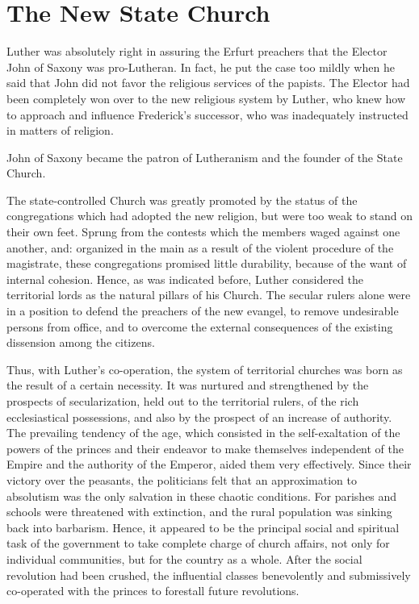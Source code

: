 \section{The New State Church}

Luther was absolutely right in assuring the Erfurt preachers that
the Elector John of Saxony was pro-Lutheran. In fact, he put the
case too mildly when he said that John did not favor the religious
services of the papists. The Elector had been completely won over
to the new religious system by Luther, who knew how to approach
and influence Frederick’s successor, who was inadequately instructed
in matters of religion.

John of Saxony became the patron of Lutheranism and the founder
of the State Church.

The state-controlled Church was greatly promoted by the status
of the congregations which had adopted the new religion, but were
too weak to stand on their own feet. Sprung from the contests
which the members waged against one another, and: organized in
the main as a result of the violent procedure of the magistrate, these
congregations promised little durability, because of the want of internal
cohesion. Hence, as was indicated before, Luther considered
the territorial lords as the natural pillars of his Church. The secular
rulers alone were in a position to defend the preachers of the new
evangel, to remove undesirable persons from office, and to overcome
the external consequences of the existing dissension among the
citizens.

Thus, with Luther’s co-operation, the system of territorial churches
was born as the result of a certain necessity. It was nurtured and
strengthened by the prospects of secularization, held out to the territorial
rulers, of the rich ecclesiastical possessions, and also by the
prospect of an increase of authority. The prevailing tendency of
the age, which consisted in the self-exaltation of the powers of
the princes and their endeavor to make themselves independent of
the Empire and the authority of the Emperor, aided them very
effectively. Since their victory over the peasants, the politicians felt
that an approximation to absolutism was the only salvation in
these chaotic conditions. For parishes and schools were threatened
with extinction, and the rural population was sinking back into
barbarism. Hence, it appeared to be the principal social and spiritual
task of the government to take complete charge of church affairs,
not only for individual communities, but for the country as a whole.
After the social revolution had been crushed, the influential classes
benevolently and submissively co-operated with the princes to forestall
future revolutions.

